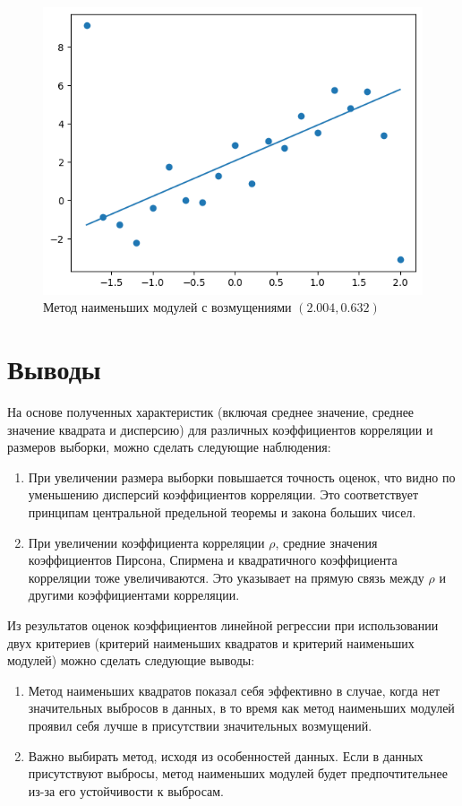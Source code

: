 \documentclass[12pt,a4paper]{article}
\begin{document}
	\begin{figure}[htbp!]
		\begin{center}
			\includegraphics[width = 1\linewidth]{graphics/lab6_sq_mod.png}
			\caption{Метод наименьших модулей с возмущениями \( (2.004, 0.632) \)}
		\end{center}
	\end{figure}

	\clearpage

	\section{Выводы}

	На основе полученных характеристик (включая среднее значение, среднее
	значение квадрата и дисперсию) для различных коэффициентов корреляции и
	размеров выборки, можно сделать следующие наблюдения:

	\begin{enumerate}
		\item При увеличении размера выборки повышается точность оценок, что
		видно по уменьшению дисперсий коэффициентов корреляции. Это
		соответствует принципам центральной предельной теоремы и закона
		больших чисел.
		\item При увеличении коэффициента корреляции \( \rho \), средние
		значения коэффициентов Пирсона, Спирмена и квадратичного коэффициента
		корреляции тоже увеличиваются. Это указывает на прямую связь между
		\( \rho \) и другими коэффициентами корреляции.
	\end{enumerate}

	Из результатов оценок коэффициентов линейной регрессии при использовании
	двух критериев (критерий наименьших квадратов и критерий наименьших
	модулей) можно сделать следующие выводы:

	\begin{enumerate}
		\item Метод наименьших квадратов показал себя эффективно в случае,
		когда нет значительных выбросов в данных, в то время как метод
		наименьших модулей проявил себя лучше в присутствии значительных
		возмущений.
		\item Важно выбирать метод, исходя из особенностей данных. Если в
		данных присутствуют выбросы, метод наименьших модулей будет
		предпочтительнее из-за его устойчивости к выбросам.
	\end{enumerate}
\end{document}
